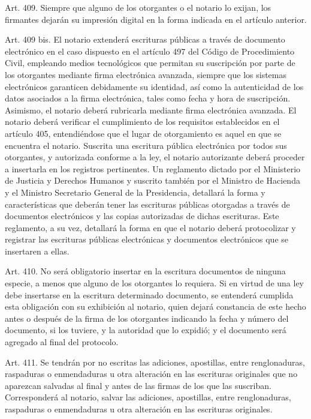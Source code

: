     Art. 409. Siempre que alguno de los otorgantes o el notario lo exijan, los firmantes dejarán su impresión digital en la forma indicada en el artículo anterior.


    Art. 409 bis. El notario extenderá escrituras públicas a través de documento electrónico en el caso dispuesto en el artículo 497 del Código de Procedimiento Civil, empleando medios tecnológicos que permitan su suscripción por parte de los otorgantes mediante firma electrónica avanzada, siempre que los sistemas electrónicos garanticen debidamente su identidad, así como la autenticidad de los datos asociados a la firma electrónica, tales como fecha y hora de suscripción. Asimismo, el notario deberá rubricarla mediante firma electrónica avanzada.
    El notario deberá verificar el cumplimiento de los requisitos establecidos en el artículo 405, entendiéndose que el lugar de otorgamiento es aquel en que se encuentra el notario.
    Suscrita una escritura pública electrónica por todos sus otorgantes, y autorizada conforme a la ley, el notario autorizante deberá proceder a insertarla en los registros pertinentes.
    Un reglamento dictado por el Ministerio de Justicia y Derechos Humanos y suscrito también por el Ministro de Hacienda y el Ministro Secretario General de la Presidencia, detallará la forma y características que deberán tener las escrituras públicas otorgadas a través de documentos electrónicos y las copias autorizadas de dichas escrituras. Este reglamento, a su vez, detallará la forma en que el notario deberá protocolizar y registrar las escrituras públicas electrónicas y documentos electrónicos que se insertaren a ellas.

    Art. 410. No será obligatorio insertar en la escritura documentos de ninguna especie, a menos que alguno de los otorgantes lo requiera.
    Si en virtud de una ley debe insertarse en la escritura determinado documento, se entenderá cumplida esta obligación con su exhibición al notario, quien dejará constancia de este hecho antes o después de la firma de los otorgantes indicando la fecha y número del documento, si los tuviere, y la autoridad que lo expidió; y el documento será agregado al final del protocolo.


    Art. 411. Se tendrán por no escritas las adiciones, apostillas, entre renglonaduras, raspaduras o enmendaduras u otra alteración en las escrituras originales que no aparezcan salvadas al final y antes de las firmas de los que las suscriban.
    Corresponderá al notario, salvar las adiciones, apostillas, entre renglonaduras, raspaduras o enmendaduras u otra alteración en las escrituras originales.



